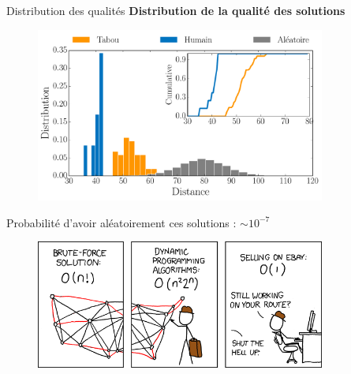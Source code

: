\documentclass{beamer}
\begin{document}
\begin{frame}{Distribution des qualités}
   \textbf{Distribution de la qualité des solutions}
  \begin{figure}[h!]
    \centering
    \includegraphics[width=0.85\textwidth]{figures/distribution_human.pdf}
  \end{figure}
  \vspace{-0.8cm}
  Probabilité d'avoir aléatoirement ces solutions : $\sim 10^{-7}$
\end{frame}






\begin{frame}
    \begin{figure}[tb]
      \centering
      \includegraphics[width=0.85\textwidth]{figures/travelling_salesman_problem.png}
    \end{figure}
  \end{frame}
\end{document}
